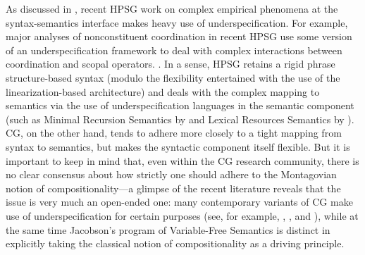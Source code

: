 \documentclass[output=paper
                ,modfonts
 	        ,biblatex
                ,babelshorthands
                ,newtxmath
                ,draftmode
                ,colorlinks, citecolor=brown
]{langscibook}
\begin{document}



As discussed in , recent HPSG work on
complex empirical phenomena at the syntax-semantics interface makes
heavy use of underspecification. For example, major analyses of
nonconstituent coordination in recent HPSG use some version of an
underspecification framework to deal with complex interactions between
coordination and scopal operators.
\citep{Yatabe2001a,BS2004a,parkea18gapping,parkDiss,yatabe-tam2017}.
In a sense, HPSG retains a rigid phrase structure-based syntax (modulo
the flexibility entertained with the use of the linearization-based
architecture) and deals with the complex mapping to semantics via the
use of underspecification languages in the semantic component (such as
Minimal Recursion Semantics by \citealt{CFPS2005a} and Lexical Resources
Semantics by \citealt{RS2004a-u}). CG, on the other hand, tends to adhere
more closely to a tight mapping from syntax to semantics, but makes
the syntactic component itself flexible. But it is important to keep
in mind that, even within the CG research community,
there is no clear consensus about 
how strictly one should adhere to the
Montagovian notion of compositionality---a glimpse of the recent 
literature reveals that the issue is very much an open-ended one: 
many contemporary variants of CG 
make use of underspecification for certain purposes (see, for example, 
\citealt[Chapter 7]{steedman2012}, \citealt{bekki14},
\citealt{bekkimineshima17} and \citealt{kubotaEA2019Geach}), 
while at the same time Jacobson's 
\citeyearpar{Jacobson1999a,Jacobson2000a} program of Variable-Free
Semantics is distinct in explicitly taking the classical notion of compositionality
as a driving principle.
\end{document}
